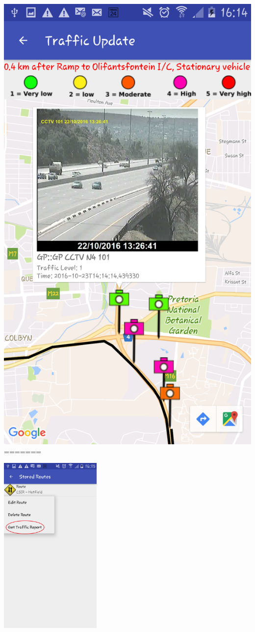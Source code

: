 \documentclass[a4paper,12pt]{article}
\begin{document}
\includegraphics[width=\textwidth]{images/TrafficReport4.png}
=======
\begin{center}
\includegraphics[width=50mm, scale=0.5]{images/TrafficReportOption.png}
\end{center}
\end{document}

